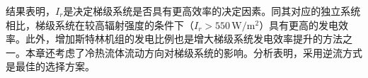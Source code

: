 结果表明，$I_r$是决定梯级系统是否具有更高效率的决定因素。同其对应的独立系统相比，梯级系统在较高辐射强度的条件下（$I_r > 550\,\mathrm{W/m^2}$）具有更高的发电效率。此外，增加斯特林机组的发电比例也是增大梯级系统发电效率提升的方法之一。本章还考虑了冷热流体流动方向对梯级系统的影响。分析表明，采用逆流方式是最佳的选择方案。

